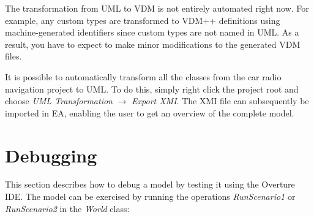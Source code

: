 


The transformation from UML to VDM is not entirely automated right now. For
example, any custom types are transformed to VDM++ definitions using
machine-generated identifiers since custom types are not named in
UML. As a result, you have to expect to make minor modifications to
the generated VDM files. 


It is possible to automatically transform all the classes from the car
radio navigation project to UML. To do this, simply right
click the project root and choose \emph{UML Transformation} $
\rightarrow $ \emph{Export XMI}. The XMI file can subsequently be
imported in EA, enabling the user to get an overview
of the complete model.

\section{Debugging}\label{sec:debugging}

This section describes how to debug a model by testing it using the
Overture IDE. The model can be exercised by running the operations
\emph{RunScenario1} or \emph{RunScenario2} in the \emph{World} class:

